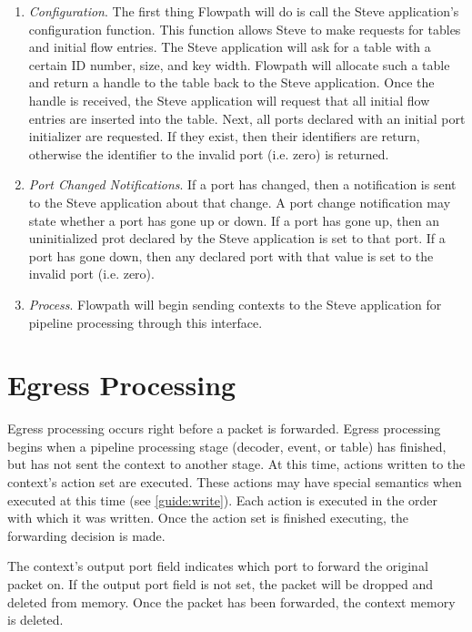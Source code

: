 \begin{enumerate}
\item \textit{Configuration}. The first thing Flowpath will do is call the Steve application's configuration function. This function allows Steve to make requests for tables and initial flow entries. The Steve application will ask for a table with a certain ID number, size, and key width. Flowpath will allocate such a table and return a handle to the table back to the Steve application. Once the handle is received, the Steve application will request that all initial flow entries are inserted into the table. Next, all ports declared with an initial port initializer are requested. If they exist, then their identifiers are return, otherwise the identifier to the invalid port (i.e. zero) is returned.

\item \textit{Port Changed Notifications}. If a port has changed, then a notification is sent to the Steve application about that change. A port change notification may state whether a port has gone up or down. If a port has gone up, then an uninitialized prot declared by the Steve application is set to that port. If a port has gone down, then any declared port with that value is set to the invalid port (i.e. zero).

\item \textit{Process}. Flowpath will begin sending contexts to the Steve application for pipeline processing through this interface.
\end{enumerate}

\section{Egress Processing} \label{egress_process}

Egress processing occurs right before a packet is forwarded. Egress processing begins when a pipeline processing stage (decoder, event, or table) has finished, but has not sent the context to another stage. At this time, actions written to the context's action set are executed. These actions may have special semantics when executed at this time (see \ref{guide:write}). Each action is executed in the order with which it was written. Once the action set is finished executing, the forwarding decision is made.

The context's output port field indicates which port to forward the original packet on. If the output port field is not set, the packet will be dropped and deleted from memory. Once the packet has been forwarded, the context memory is deleted. 